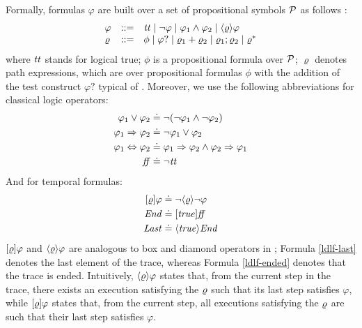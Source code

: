 Formally, \LDLf formulas $\varphi$ are built over a set of propositional symbols $\mathcal{P}$ as follows \citep{Brafman2017SpecifyingNR}:
\[\begin{array}{lcl}
\varphi &::=& {\mathit{tt}}  \mid \lnot \varphi \mid \varphi_1 \land \varphi_2 \mid \langle \varrho \rangle\varphi \\
\varrho &::=& \phi \mid \varphi? \mid  \varrho_1 + \varrho_2 \mid \varrho_1; \varrho_2 \mid \varrho^*
\end{array}
\]
where ${\mathit{tt}}$ stands for logical true; $\phi$ is a propositional
formula over $\mathcal{P}$; $\varrho$ denotes path expressions, which are \REGEX over
propositional formulas $\phi$ with the addition of the test construct
$\varphi?$ typical of \PDL. Moreover, we use the following abbreviations for classical logic operators:
\begin{align*}
\varphi_1\lor\varphi_2 &\doteq \lnot(\lnot \varphi_1\land \lnot
\varphi_2)\\
\varphi_1 \Rightarrow \varphi_2 &\doteq \lnot \varphi_1 \vee \varphi_2\\
\varphi_1 \Leftrightarrow \varphi_2 &\doteq \varphi_1 \Rightarrow \varphi_2 \wedge \varphi_2 \Rightarrow \varphi_1\\
\mathit{ff} &\doteq \lnot {\mathit{tt}}\\
\end{align*}
And for temporal formulas:
\begin{align}
[\varrho]\varphi &\doteq \lnot\langle \varrho \rangle\lnot\varphi \label{ldlf-box}\\
\mathit{End} &\doteq [\mathit{true}]\mathit{ff} \label{ldlf-ended}\\
\mathit{Last} &\doteq \langle \mathit{true} \rangle\mathit{End} \label{ldlf-last}
\end{align}
$[\varrho]\varphi$ and $\langle \varrho \rangle\varphi$ are analogous to box and diamond operators in \PDL; Formula \ref{ldlf-last} denotes the last element of the trace, whereas Formula \ref{ldlf-ended} denotes that the trace is ended.
Intuitively, $\langle \varrho \rangle\varphi$ states that, from the current step
in the trace, there exists an execution satisfying the \REGEX $\varrho$ 
such that its last step satisfies $\varphi$, while
$[\varrho]\varphi$ states that, from the current step, all executions
satisfying the \REGEX $\varrho$ are such that their last step
satisfies $\varphi$.
